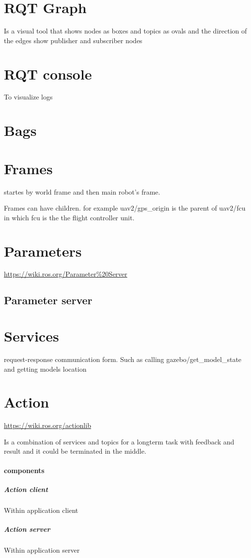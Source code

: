\section{RQT Graph}
    Is a visual tool that shows nodes as boxes and topics as ovals and the direction of the edges show publisher and subscriber nodes
\section{RQT console}
    To visualize logs
\section{Bags}
\section{Frames}
     startes by world frame and then main robot's frame.
    
    Frames can have children. for example uav2/gps\_origin is the parent of uav2/fcu in which fcu is the the flight controller unit.
\section{Parameters}
    \url{https://wiki.ros.org/Parameter%20Server}
    \subsection{Parameter server}
\section{Services}
    request-response communication form. Such as calling gazebo/get\_model\_state and getting models location
\section{Action}
\url{https://wiki.ros.org/actionlib}

Is a combination of services and topics for a longterm task with feedback and result and it could be terminated in the middle.
    \paragraph{components}
        \subparagraph{Action client}
            Within application client
        \subparagraph{Action server}
            Within application server
    
